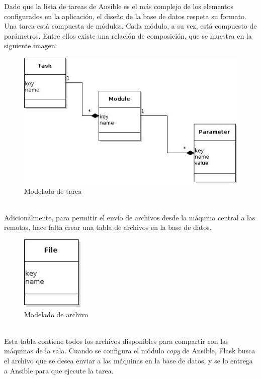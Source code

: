 \documentclass[a4paper,12pt]{article}
\begin{document}
Dado que la lista de tareas de Ansible es el más complejo de los elementos configurados en la aplicación, el diseño de la base de datos respeta su formato. Una tarea está compuesta de módulos. Cada módulo, a su vez, está compuesto de parámetros. Entre ellos existe una relación de composición, que se muestra en la siguiente imagen:\\

\begin{figure}[htb]
\centering
\includegraphics[width=.9\linewidth]{./img/Task.jpg}
\caption{Modelado de tarea}
\end{figure}\\

Adicionalmente, para permitir el envío de archivos desde la máquina central a las remotas, hace falta crear una tabla de archivos en la base de datos.\\

\begin{figure}[htb]
\centering
\includegraphics[width=3cm]{./img/file.jpg}
\caption{Modelado de archivo}
\end{figure}\\


Esta tabla contiene todos los archivos disponibles para compartir con las máquinas de la sala. Cuando se configura el módulo \emph{copy} de Ansible, Flask busca el archivo que se desea enviar a las máquinas en la base de datos, y se lo entrega a Ansible para que ejecute la tarea.\\
\end{document}
